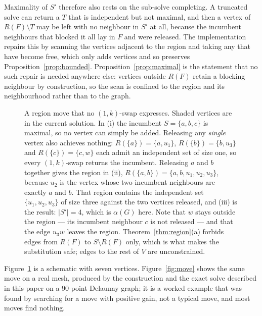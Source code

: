 \documentclass[pdflatex,sn-mathphys-num]{sn-jnl}
\theoremstyle{thmstyleone}%
\theoremstyle{thmstyletwo}%
\begin{document}
Maximality of $S'$ therefore also rests on the sub-solve completing. A truncated
solve can return a $T$ that is independent but not maximal, and then a vertex of
$R(F) \setminus T$ may be left with no neighbour in $S'$ at all, because the
incumbent neighbours that blocked it all lay in $F$ and were released. The
implementation repairs this by scanning the vertices adjacent to the region and
taking any that have become free, which only adds vertices and so preserves
Proposition~\ref{prop:bounded}. Proposition~\ref{prop:maximal} is the statement
that no such repair is needed anywhere else: vertices outside $R(F)$ retain a
blocking neighbour by construction, so the scan is confined to the region and its
neighbourhood rather than to the graph.

\begin{figure}[htbp]
\centering
\resizebox{\textwidth}{!}{}
\caption{A region move that no $(1,k)$-swap expresses. Shaded
vertices are in the current solution. In (i) the incumbent $S=\{a,b,c\}$ is
maximal, so no vertex can simply be added. Releasing any \emph{single} vertex
also achieves nothing: $R(\{a\})=\{a,u_1\}$, $R(\{b\})=\{b,u_3\}$ and
$R(\{c\})=\{c,w\}$ each admit an independent set of size one, so every
$(1,k)$-swap returns the incumbent. Releasing $a$ and $b$ together gives the
region in (ii), $R(\{a,b\})=\{a,b,u_1,u_2,u_3\}$, because $u_2$ is the vertex
whose two incumbent neighbours are exactly $a$ and $b$. That region contains the
independent set $\{u_1,u_2,u_3\}$ of size three against the two vertices
released, and (iii) is the result: $|S'|=4$, which is $\alpha(G)$ here. Note that
$w$ stays outside the region --- its incumbent neighbour $c$ is not released ---
and that the edge $u_3w$ leaves the region. Theorem~\ref{thm:region}(a) forbids
edges from $R(F)$ to $S \setminus R(F)$ only, which is what makes the
substitution safe; edges to the rest of $V$ are unconstrained.}
\label{fig:region}
\end{figure}

Figure~\ref{fig:region} is a schematic with seven vertices. Figure~\ref{fig:move}
shows the same move on a real mesh, produced by the construction and the exact
solve described in this paper on a 90-point Delaunay graph; it is a worked example
that was found by searching for a move with positive gain, not a typical move,
and most moves find nothing.
\end{document}
